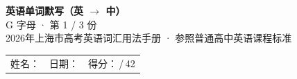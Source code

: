 \documentclass[10pt,a4paper]{article}
\begin{document}
\pagestyle{plain}

\begin{center}
{\LARGE\bfseries 英语单词默写（英 $\to$ 中）}\\[0.22em]
{\large G 字母 · 第 1 / 3 份}\\[0.18em]
{\small 2026年上海市高考英语词汇用法手册 · 参照普通高中英语课程标准}
\end{center}

\vspace{0.25em}
\noindent\begin{tabular}{@{}p{}@{}p{}@{}p{}@{}}
姓名：\underline{\hspace{2.0cm}} & 日期：\underline{\hspace{2.0cm}} & 得分：\underline{\hspace{1.3cm}}\,/\,42 \\
\end{tabular}

\vspace{0.3em}

\vspace{0.08em}
\end{document}
